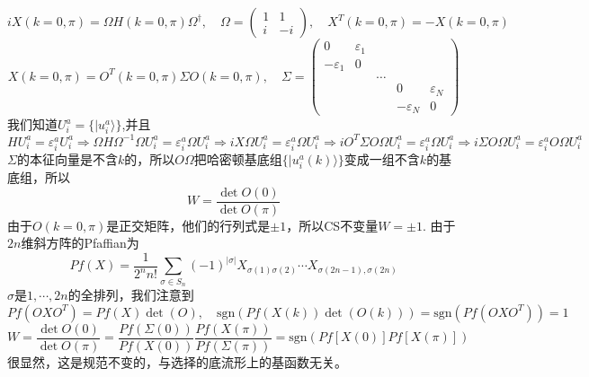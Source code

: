 \documentclass{article}
\numberwithin{equation}{subsection}
\begin{document}
\begin{equation}
    iX(k=0,\pi)=\Omega H(k=0,\pi)\Omega^\dagger,\quad\Omega=\begin{pmatrix}
        1&1\\
        i&-i
    \end{pmatrix},\quad X^T(k=0,\pi)=-X(k=0,\pi)
\end{equation}
\begin{equation}
    X(k=0,\pi)=O^T(k=0,\pi)\Sigma O(k=0,\pi),\quad\Sigma=\begin{pmatrix}
        0&\varepsilon_1\\
        -\varepsilon_1&0\\
        &&\ldots\\
        &&&0&\varepsilon_N\\
        &&&-\varepsilon_N&0
    \end{pmatrix}
\end{equation}
我们知道$U_i^a=\{|u_i^a\rangle\}$,并且
\begin{equation}
    HU_i^a=\varepsilon_i^a U_i^a\Rightarrow\Omega H\Omega^{-1}\Omega U_i^a=\varepsilon_i^a\Omega U_i^a\Rightarrow iX\Omega U_i^a=\varepsilon_i^a\Omega U_i^a\Rightarrow iO^T\Sigma O\Omega U_i^a=\varepsilon_i^a\Omega U_i^a\Rightarrow i\Sigma O\Omega U_i^a=\varepsilon_i^aO\Omega U_i^a
\end{equation}
$\Sigma$的本征向量是不含$k$的，所以$O\Omega$把哈密顿基底组$\{|u_i^a(k)\rangle\}$变成一组不含$k$的基底组，所以
\begin{equation}
    W=\frac{\det O(0)}{\det O(\pi)}
\end{equation}
由于$O(k=0,\pi)$是正交矩阵，他们的行列式是$\pm 1$，所以CS不变量$W=\pm 1$. 由于$2n$维斜方阵的Pfaffian为
\begin{equation}
    Pf(X)=\frac{1}{2^n n!}\sum_{\sigma\in S_n}(-1)^{|\sigma|}X_{\sigma(1)\sigma(2)}\cdots X_{\sigma(2n-1),\sigma(2n)}
\end{equation}
$\sigma$是$1,\cdots,2n$的全排列，我们注意到
\begin{equation}
    Pf(OXO^T)=Pf(X)\det(O),\quad\mathrm{sgn}(Pf(X(k))\det(O(k)))=\mathrm{sgn}(Pf(OXO^T))=1
\end{equation}
\begin{equation}
    W=\frac{\det O(0)}{\det O(\pi)}=\frac{Pf(\Sigma(0))}{Pf(X(0))}\frac{Pf(X(\pi))}{Pf(\Sigma(\pi))}=\mathrm{sgn}(Pf[X(0)]Pf[X(\pi)])
\end{equation}
很显然，这是规范不变的，与选择的底流形上的基函数无关。
\end{document}
